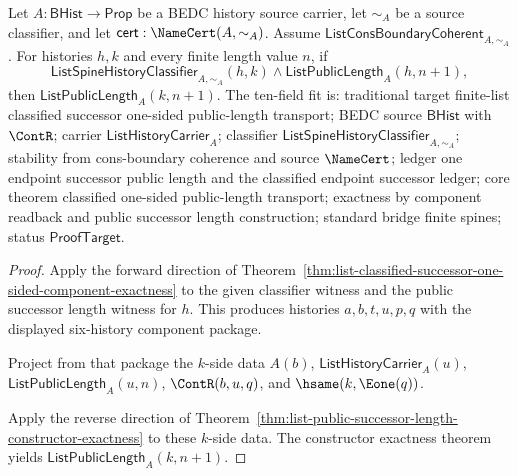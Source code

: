 \begin{theorem}
\label{thm:list-classified-successor-one-sided-length-transport}
Let $A:\mathsf{BHist}\to\mathsf{Prop}$ be a BEDC history source carrier, let
$\sim_A$ be a source classifier, and let
$\mathsf{cert}:\NameCert(A,\sim_A)$. Assume
$\mathsf{ListConsBoundaryCoherent}_{A,\sim_A}$. For histories $h,k$ and every
finite length value $n$, if
$$
\mathsf{ListSpineHistoryClassifier}_{A,\sim_A}(h,k)\land
\mathsf{ListPublicLength}_A(h,n+1),
$$
then $\mathsf{ListPublicLength}_A(k,n+1)$.
The ten-field fit is: traditional target finite-list classified successor
one-sided public-length transport; BEDC source $\mathsf{BHist}$ with $\ContR$;
carrier $\mathsf{ListHistoryCarrier}_A$; classifier
$\mathsf{ListSpineHistoryClassifier}_{A,\sim_A}$; stability from
cons-boundary coherence and source $\NameCert$; ledger one endpoint successor
public length and the classified endpoint successor ledger; core theorem
classified one-sided public-length transport; exactness by component readback
and public successor length construction; standard bridge finite spines; status
$\mathsf{ProofTarget}$.
\end{theorem}
\begin{proof}
Apply the forward direction of
Theorem~\ref{thm:list-classified-successor-one-sided-component-exactness} to the
given classifier witness and the public successor length witness for $h$. This
produces histories $a,b,t,u,p,q$ with the displayed six-history component
package.

Project from that package the $k$-side data $A(b)$,
$\mathsf{ListHistoryCarrier}_A(u)$, $\mathsf{ListPublicLength}_A(u,n)$,
$\ContR(b,u,q)$, and $\hsame(k,\Eone(q))$.

Apply the reverse direction of
Theorem~\ref{thm:list-public-successor-length-constructor-exactness} to these
$k$-side data. The constructor exactness theorem yields
$\mathsf{ListPublicLength}_A(k,n+1)$.
\end{proof}

